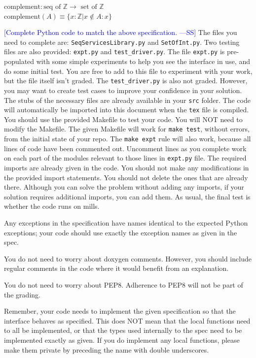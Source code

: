 \documentclass[12pt,fleqn]{examtst}
\newcommand{\authornote}[3]{\textcolor{#1}{[#3 ---#2]}}
\newcommand{\authornote}[3]{}
\newcommand{\wss}[1]{\authornote{blue}{SS}{#1}}
\begin{document}
\noindent $\mbox{complement}: \text{seq of } \mathbb{Z} \rightarrow \mbox{ set of }
\mathbb{Z}$\\
$\mbox{complement}(A) \equiv \{ x: \mathbb{Z} | x \not\in A : x \}$\\


\newpage

\noindent
\begin{minipage}{\textwidth}
 \label{Q_PythonCode}

\wss{Complete Python code to match the above specification.}  The files you need
to complete are: \texttt{SeqServicesLibrary.py} and \texttt{SetOfInt.py}.  Two
testing files are also provided: \texttt{expt.py} and \texttt{test\_driver.py}.
The file \texttt{expt.py} is pre-populated with some simple experiments to help
you see the interface in use, and do some initial test.  You are free to add to
this file to experiment with your work, but the file itself isn't graded.  The
\texttt{test\_driver.py} is also not graded.  However, you may want to create
test cases to improve your confidence in your solution.  The stubs of the
necessary files are already available in your \texttt{src} folder.  The code
will automatically be imported into this document when the \texttt{tex} file is
compiled.  You should use the provided Makefile to test your code.  You will NOT
need to modify the Makefile.  The given Makefile will work for \texttt{make
  test}, without errors, from the initial state of your repo.  The \texttt{make
  expt} rule will also work, because all lines of code have been commented out.
Uncomment lines as you complete work on each part of the modules relevant to
those lines in \texttt{expt.py} file.  The required imports are already given in
the code.  You should not make any modifications in the provided import
statements.  You should not delete the ones that are already there.  Although
you can solve the problem without adding any imports, if your solution requires
additional imports, you can add them.  As usual, the final test is whether the
code runs on mills.

Any exceptions in the specification have names identical to the expected Python
exceptions; your code should use exactly the exception names as given in the
spec.

You do not need to worry about doxygen comments.  However, you should include
regular comments in the code where it would benefit from an explanation.

You do not need to worry about PEP8.  Adherence to PEP8 will not be part of the
grading.

Remember, your code needs to implement the given specification so that the
interface behaves as specified.  This does NOT mean that the local functions
need to all be implemented, or that the types used internally to the spec need
to be implemented exactly as given.  If you do implement any local functions,
please make them private by preceding the name with double underscores.\\

\end{minipage}
\end{document}
